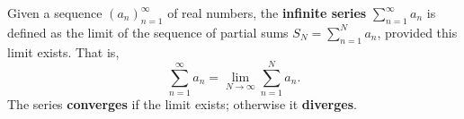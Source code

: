 Given a sequence $(a_n)_{n=1}^{\infty}$ of real numbers, the \textbf{infinite series} $\sum_{n=1}^{\infty} a_n$ is defined as the limit of the sequence of partial sums $S_N = \sum_{n=1}^{N} a_n$, provided this limit exists. That is,
$$\sum_{n=1}^{\infty} a_n = \lim_{N \to \infty} \sum_{n=1}^{N} a_n.$$
The series \textbf{converges} if the limit exists; otherwise it \textbf{diverges}.
